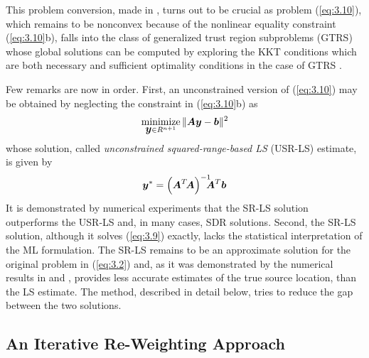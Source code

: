 This problem conversion, made in \cite{BeckStLi}, turns out to be crucial as problem (\ref{eq:3.10}), which remains to be nonconvex because of the nonlinear equality constraint (\ref{eq:3.10}b), falls into the class of generalized trust region subproblems (GTRS) \cite{More, FortinWol}  whose global solutions can be computed by exploring the KKT conditions which are both necessary and sufficient optimality conditions in the case of GTRS \cite{More}.

Few remarks are now in order. First, an unconstrained version of (\ref{eq:3.10}) may be obtained by neglecting the constraint in (\ref{eq:3.10}b) as
\begin{equation} \label{eq:3.12}%
\Min_{{\By} \in R^{n+1}} \|\BA\By-\Bb\|^2
\end{equation}
whose solution, called \textit{unconstrained squared-range-based LS }(USR-LS) estimate, is given by
\begin{equation} \label{eq:3.13}%
\By^*=\left(\BA^T\!\BA\right)^{-1}\!\!\!\!\BA^T\Bb
\end{equation}
It is demonstrated by numerical experiments \cite{BeckStLi} that the SR-LS solution outperforms the USR-LS and, in many cases, SDR solutions. Second, the SR-LS solution, although it solves (\ref{eq:3.9}) exactly, lacks the statistical interpretation of the ML formulation. The SR-LS remains to be an approximate solution for the original problem in (\ref{eq:3.2}) and, as it was demonstrated by the numerical results in \cite{BeckTeCh} and \cite{BeckGPS}, provides less accurate estimates of the true source location, than the LS estimate. The method, described in detail below, tries to reduce the gap between the two solutions.

\subsection{An Iterative Re-Weighting Approach}%


